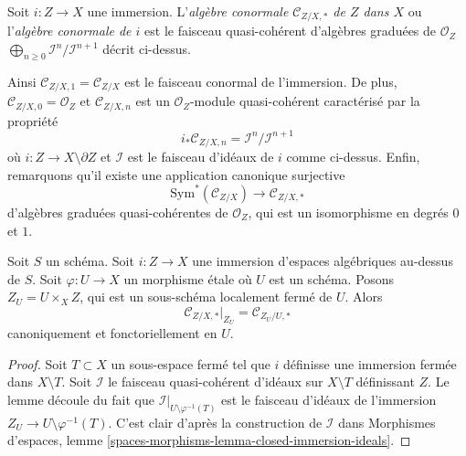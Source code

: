 \begin{definition}
\label{definition-conormal-algebra}
Soit $i : Z \to X$ une immersion. L'{\it algèbre conormale
$\mathcal{C}_{Z/X, *}$ de $Z$ dans $X$} ou l'{\it algèbre conormale de $i$}
est le faisceau quasi-cohérent d'algèbres graduées de $\mathcal{O}_Z$
$\bigoplus_{n \geq 0} \mathcal{I}^n/\mathcal{I}^{n + 1}$ décrit ci-dessus.
\end{definition}

\noindent
Ainsi $\mathcal{C}_{Z/X, 1} = \mathcal{C}_{Z/X}$ est le faisceau conormal
de l'immersion. De plus, $\mathcal{C}_{Z/X, 0} = \mathcal{O}_Z$ et
$\mathcal{C}_{Z/X, n}$ est un $\mathcal{O}_Z$-module quasi-cohérent
caractérisé par la propriété
\begin{equation}
\label{equation-conormal-in-degree-n}
i_*\mathcal{C}_{Z/X, n} = \mathcal{I}^n/\mathcal{I}^{n + 1}
\end{equation}
où $i : Z \to X \setminus \partial Z$ et $\mathcal{I}$ est le faisceau
d'idéaux de $i$ comme ci-dessus. Enfin, remarquons qu'il existe une application canonique surjective
\begin{equation}
\label{equation-conormal-algebra-quotient}
\text{Sym}^*(\mathcal{C}_{Z/X}) \longrightarrow \mathcal{C}_{Z/X, *}
\end{equation}
d'algèbres graduées quasi-cohérentes de $\mathcal{O}_Z$, qui est un isomorphisme
en degrés $0$ et $1$.

\begin{lemma}
\label{lemma-etale-conormal-algebra}
Soit $S$ un schéma. Soit $i : Z \to X$ une immersion d'espaces algébriques
au-dessus de $S$. Soit $\varphi : U \to X$ un morphisme \'etale où $U$ est un
schéma. Posons $Z_U = U \times_X Z$, qui est un sous-schéma localement fermé de $U$.
Alors
$$
\mathcal{C}_{Z/X, *}|_{Z_U} = \mathcal{C}_{Z_U/U, *}
$$
canoniquement et fonctoriellement en $U$.
\end{lemma}

\begin{proof}
Soit $T \subset X$ un sous-espace fermé tel que $i$ définisse une immersion
fermée dans $X \setminus T$. Soit $\mathcal{I}$ le faisceau quasi-cohérent
d'idéaux sur $X \setminus T$ définissant $Z$. Le lemme découle
du fait que
$\mathcal{I}|_{U \setminus \varphi^{-1}(T)}$ est le faisceau d'idéaux de
l'immersion $Z_U \to U \setminus \varphi^{-1}(T)$.
C'est clair d'après la construction de $\mathcal{I}$ dans
Morphismes d'espaces, lemme
\ref{spaces-morphisms-lemma-closed-immersion-ideals}.
\end{proof}

